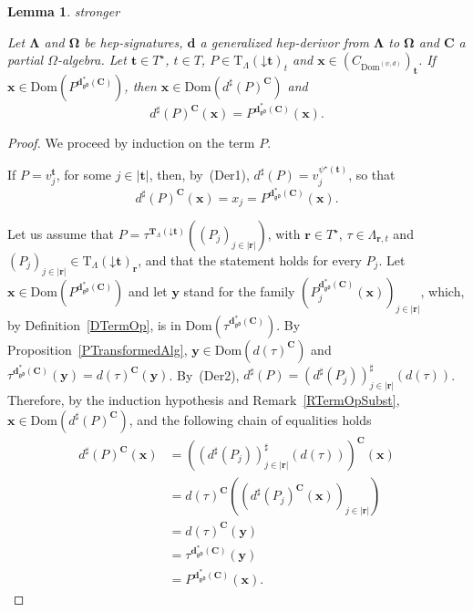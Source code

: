 \documentclass[a4paper, reqno]{amsbook}
\makeatletter
\newcommand{\bb}[1]{\ensuremath{\lvert #1 \rvert}}
\newcommand{\vs}[1]{\mathbin{\downarrow}#1}
\newcommand{\sig}[1]{\mathbf{#1}}             %
\newcommand{\Dom}{\mathrm{Dom}}
\newcommand{\gd}{\mathfrak{gd}}              %
\theoremstyle{plain}
\newtheorem{lemma}[theorem]{Lemma}
\theoremstyle{definition}
\newcommand*{\CA@leanpending}{}
\newcommand*{\CA@leanrelation}{}
\newcommand*{\lean}[2]{%
  \ifcsname\string\color@lean@#1\endcsname\else
    \PackageError{main}{Unknown relation `#1' in \string\lean}{Use equivalent, weaker or stronger.}%
  \fi
  \gdef\CA@leanrelation{#1}%
  \gdef\CA@leanpending{#2}}
\makeatother
\begin{document}
\begin{lemma}\label{LGenHepDerivorTermOp}\lean{stronger}{GeneralizedHepDerivor.partialEval_translate}
Let $\sig{\Lambda}$ and $\sig{\Omega}$ be hep-signatures, $\mathbf{d}$ a generalized hep-derivor from $\sig{\Lambda}$ to $\sig{\Omega}$ and $\mathbf{C}$ a partial $\Omega$-algebra.
Let $\mathbf{t}\in T^{\star}$, $t\in T$, $P\in\mathrm{T}_{\Lambda}(\vs{\mathbf{t}})_{t}$ and $\mathbf{x}\in(C_{\Dom^{(\psi,d)}})_{\mathbf{t}}$.
If $\mathbf{x}\in\Dom(P^{\mathbf{d}^{\ast}_{\gd}(\mathbf{C})})$, then $\mathbf{x}\in\Dom(d^{\sharp}(P)^{\mathbf{C}})$ and
$$
d^{\sharp}(P)^{\mathbf{C}}(\mathbf{x})=P^{\mathbf{d}^{\ast}_{\gd}(\mathbf{C})}(\mathbf{x}).
$$
\end{lemma}
\begin{proof}
We proceed by induction on the term $P$.

If $P=v^{\mathbf{t}}_{j}$, for some $j\in\bb{\mathbf{t}}$, then, by~(Der1), $d^{\sharp}(P)=v^{\psi^{\star}(\mathbf{t})}_{j}$, so that 
\[d^{\sharp}(P)^{\mathbf{C}}(\mathbf{x})=x_{j}=P^{\mathbf{d}^{\ast}_{\gd}(\mathbf{C})}(\mathbf{x}).\]

Let us assume that $P=\tau^{\mathbf{T}_{\Lambda}(\vs{\mathbf{t}})}((P_{j})_{j\in\bb{\mathbf{r}}})$, with $\mathbf{r}\in T^{\star}$, $\tau\in\Lambda_{\mathbf{r},t}$ and $(P_{j})_{j\in\bb{\mathbf{r}}}\in\mathrm{T}_{\Lambda}(\vs{\mathbf{t}})_{\mathbf{r}}$, and that the statement holds for every $P_{j}$.
Let $\mathbf{x}\in\Dom(P^{\mathbf{d}^{\ast}_{\gd}(\mathbf{C})})$ and let $\mathbf{y}$ stand for the family $(P_{j}^{\mathbf{d}^{\ast}_{\gd}(\mathbf{C})}(\mathbf{x}))_{j\in\bb{\mathbf{r}}}$, which, by Definition~\ref{DTermOp}, is in $\Dom(\tau^{\mathbf{d}^{\ast}_{\gd}(\mathbf{C})})$.
By Proposition~\ref{PTransformedAlg}, $\mathbf{y}\in\Dom(d(\tau)^{\mathbf{C}})$ and $\tau^{\mathbf{d}^{\ast}_{\gd}(\mathbf{C})}(\mathbf{y})=d(\tau)^{\mathbf{C}}(\mathbf{y})$.
By~(Der2), $d^{\sharp}(P)=(d^{\sharp}(P_{j}))^{\sharp}_{j\in\bb{\mathbf{r}}}(d(\tau))$.
Therefore, by the induction hypothesis and Remark~\ref{RTermOpSubst}, $\mathbf{x}\in\Dom(d^{\sharp}(P)^{\mathbf{C}})$, and the following chain of equalities holds
\begin{align*}
d^{\sharp}(P)^{\mathbf{C}}\left(\mathbf{x}\right)
&=
\left(\left(d^{\sharp}(P_{j})\right)^{\sharp}_{j\in\bb{\mathbf{r}}}\left(d(\tau)\right)\right)^{\mathbf{C}}\left(\mathbf{x}\right)
\tag{1}
\\&=
d(\tau)^{\mathbf{C}}\left(\left(d^{\sharp}(P_{j})^{\mathbf{C}}(\mathbf{x})\right)_{j\in\bb{\mathbf{r}}}\right)
\tag{2}
\\&=
d(\tau)^{\mathbf{C}}\left(\mathbf{y}\right)
\tag{3}
\\&=
\tau^{\mathbf{d}^{\ast}_{\gd}(\mathbf{C})}\left(\mathbf{y}\right)
\tag{4}
\\&=
P^{\mathbf{d}^{\ast}_{\gd}(\mathbf{C})}\left(\mathbf{x}\right).
\tag{5}
\end{align*}


\end{proof}
\end{document}
